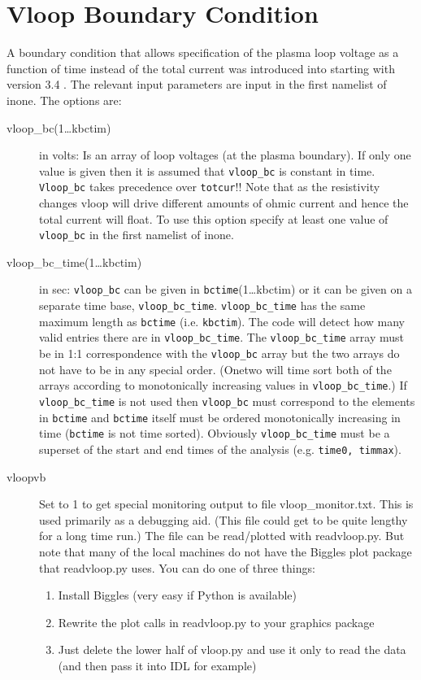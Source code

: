 \section{Vloop  Boundary Condition} 

A boundary condition that allows specification  of the plasma
loop voltage as a function of time instead of the total current
was introduced into \ot starting with version 3.4 . The
relevant input parameters are input in the first namelist of inone.
The options are:
\begin{description}
 \item[vloop\_bc(1\ldots kbctim)] in volts: Is an array of loop voltages (at the
 plasma boundary). If only one value is given then it is assumed that
 \texttt{vloop\_bc} is constant in time. \texttt{Vloop\_bc} takes precedence
 over \texttt{totcur}!!  Note that as the resistivity changes vloop will drive
 different amounts of ohmic current and hence the total current will float. To
 use this option specify at least one value of \texttt{vloop\_bc} in the first
 namelist of inone.  
 \item[vloop\_bc\_time(1\ldots kbctim)] in sec: \texttt{vloop\_bc} can be given
 in \texttt{bctime}(1\ldots kbctim)  or it can be given on a separate time base,
 \texttt{vloop\_bc\_time}. \texttt{vloop\_bc\_time} has the same maximum length
 as \texttt{bctime} (i.e. \texttt{kbctim}). The code will detect how many valid
 entries there are in  \texttt{vloop\_bc\_time}. The \texttt{vloop\_bc\_time}
 array must be in 1:1 correspondence with the  \texttt{vloop\_bc} array but the
 two arrays do not have to be in any special order. (Onetwo will time sort  both
 of the arrays according to monotonically increasing values in
 \texttt{vloop\_bc\_time}.) If \texttt{vloop\_bc\_time} is not used then
 \texttt{vloop\_bc} must correspond to the elements in \texttt{bctime} and
 \texttt{bctime} itself must be ordered monotonically increasing in time
 (\texttt{bctime} is not time sorted). Obviously \texttt{vloop\_bc\_time} must
 be a superset of the start and end times of the analysis  (e.g. \texttt{time0,
 timmax}).
 \item[vloopvb] Set to 1 to get special monitoring output to file
 vloop\_monitor.txt. This is used primarily as a debugging
 aid. (This file could get to be quite lengthy for a long
 time run.)  The file can be read/plotted with readvloop.py.
 But note that many of the local machines do not have the
 Biggles plot package that readvloop.py uses.
 You can do one of three things:
 \begin{enumerate}
  \item Install Biggles (very easy if Python is available)
  \item Rewrite the plot calls in readvloop.py to your graphics package
  \item Just delete the lower half of vloop.py and use it only to read the data
  (and then pass it into IDL for example)
 \end{enumerate}
\end{description}

